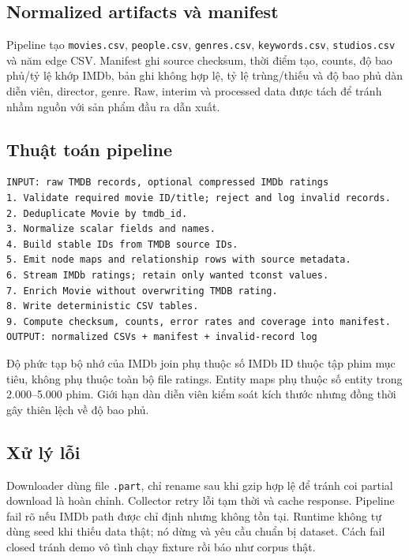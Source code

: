\subsection{Normalized artifacts và manifest}

Pipeline tạo \texttt{movies.csv}, \texttt{people.csv}, \texttt{genres.csv}, \texttt{keywords.csv},
\texttt{studios.csv} và năm edge CSV. Manifest ghi source checksum, thời điểm tạo, counts,
độ bao phủ/tỷ lệ khớp IMDb, bản ghi không hợp lệ, tỷ lệ trùng/thiếu và độ bao phủ dàn diễn viên,
director, genre. Raw, interim và processed data được tách để tránh nhầm nguồn với
sản phẩm đầu ra dẫn xuất.

\subsection{Thuật toán pipeline}

\begin{Verbatim}[fontsize=\scriptsize,frame=single]
INPUT: raw TMDB records, optional compressed IMDb ratings
1. Validate required movie ID/title; reject and log invalid records.
2. Deduplicate Movie by tmdb_id.
3. Normalize scalar fields and names.
4. Build stable IDs from TMDB source IDs.
5. Emit node maps and relationship rows with source metadata.
6. Stream IMDb ratings; retain only wanted tconst values.
7. Enrich Movie without overwriting TMDB rating.
8. Write deterministic CSV tables.
9. Compute checksum, counts, error rates and coverage into manifest.
OUTPUT: normalized CSVs + manifest + invalid-record log
\end{Verbatim}

Độ phức tạp bộ nhớ của IMDb join phụ thuộc số IMDb ID thuộc tập phim mục tiêu,
không phụ thuộc toàn bộ file ratings. Entity maps phụ thuộc số entity trong
2.000–5.000 phim. Giới hạn dàn diễn viên kiểm soát kích thước nhưng đồng thời gây
thiên lệch về độ bao phủ.

\subsection{Xử lý lỗi}

Downloader dùng file \texttt{.part}, chỉ rename sau khi gzip hợp lệ để tránh coi partial
download là hoàn chỉnh. Collector retry lỗi tạm thời và cache response. Pipeline
fail rõ nếu IMDb path được chỉ định nhưng không tồn tại. Runtime không tự dùng seed
khi thiếu data thật; nó dừng và yêu cầu chuẩn bị dataset. Cách fail closed tránh
demo vô tình chạy fixture rồi báo như corpus thật.

